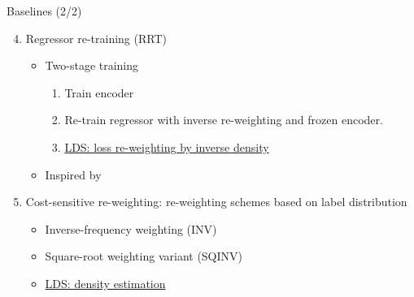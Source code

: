 \begin{frame}{Baselines (2/2)}
	\begin{enumerate}\setcounter{enumi}{3}\setlength\itemsep{1.5em}
		\item<1-> Regressor re-training (RRT)
		\begin{itemize}
			\item Two-stage training
			\begin{enumerate}
				\item Train encoder
				\item Re-train regressor with inverse re-weighting and frozen encoder.
				\item[+]<2-> \underline{LDS: loss re-weighting by inverse density}
			\end{enumerate}
			\item Inspired by \cite{kang2019decoupling}
		\end{itemize}
		\item<3-> Cost-sensitive re-weighting: re-weighting schemes based on label distribution
		\begin{itemize}
			\item Inverse-frequency weighting (INV)
			\item Square-root weighting variant (SQINV)
			\item[+]<4-> \underline{LDS: density estimation}
		\end{itemize}
	\end{enumerate}
\end{frame}